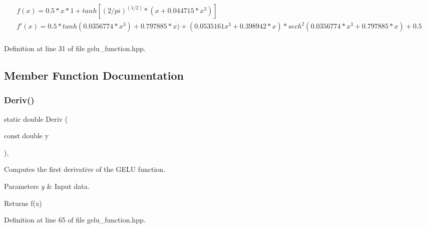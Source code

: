 \begin{eqnarray*} f(x) = 0.5 * x * {1 + tanh[(2/pi)^(1/2) * (x + 0.044715 * x^3)]} \\ f'(x) = 0.5 * tanh(0.0356774 * x^3) + 0.797885 * x) + (0.0535161x^3 + 0.398942 * x) * sech^2(0.0356774 * x^3+0.797885 * x) + 0.5\\ \end{eqnarray*} 

Definition at line 31 of file gelu\+\_\+function.\+hpp.



\subsection{Member Function Documentation}
\mbox{\label{classmlpack_1_1ann_1_1GELUFunction_a163d34fd09f8edf457164f5033c635cf}} 
\subsubsection{Deriv()\hspace{0.1cm}{\footnotesize\ttfamily [1/2]}}
{\footnotesize\ttfamily static double Deriv (\begin{DoxyParamCaption}\item[{const double}]{y }\end{DoxyParamCaption})\hspace{0.3cm}{\ttfamily [inline]}, {\ttfamily [static]}}



Computes the first derivative of the G\+E\+LU function. 


\begin{DoxyParams}{Parameters}
{\em y} & Input data. \\
\hline
\end{DoxyParams}
\begin{DoxyReturn}{Returns}
f\textquotesingle{}(x) 
\end{DoxyReturn}


Definition at line 65 of file gelu\+\_\+function.\+hpp.

\mbox{\label{classmlpack_1_1ann_1_1GELUFunction_ad442502c34b67303b74c735641dab790}} 
